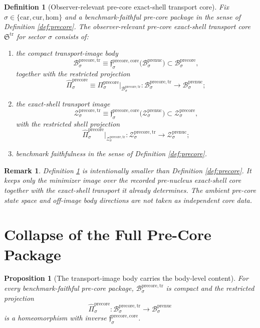 \documentclass[11pt]{article}
\newcommand{\Car}{\mathrm{car}}
\newcommand{\Cur}{\mathrm{cur}}
\newcommand{\Hom}{\mathrm{hom}}
\newcommand{\PreNucBody}[1]{\mathcal B_{#1}^{\mathrm{prenuc}}}
\newcommand{\PreNucShellSet}[1]{\mathcal Z_{#1}^{\mathrm{prenuc}}}
\newcommand{\PreCoreTransportCore}{\mathfrak S^{\mathrm{tr}}}
\newcommand{\PreCoreBody}[1]{\mathcal B_{#1}^{\mathrm{precore}}}
\newcommand{\PreCoreProj}[1]{\Pi_{#1}^{\mathrm{precore}}}
\newcommand{\PreCoreCoreMin}[1]{\mathfrak f_{#1}^{\mathrm{precore,core}}}
\newcommand{\PreCoreShellSet}[1]{\mathcal Z_{#1}^{\mathrm{precore}}}
\newcommand{\PreCoreTrBody}[1]{\mathcal B_{#1}^{\mathrm{precore,tr}}}
\newcommand{\PreCoreTrProj}[1]{\widehat{\Pi}_{#1}^{\mathrm{precore}}}
\newcommand{\PreCoreTrShell}[1]{\mathcal Z_{#1}^{\mathrm{precore,tr}}}
\newtheorem{definition}{Definition}
\newtheorem{proposition}{Proposition}
\newtheorem{remark}{Remark}
\begin{document}
\begin{definition}[Observer-relevant pre-core exact-shell transport core]
\label{def:transportcore}
Fix \(\sigma\in\{\Car,\Cur,\Hom\}\) and a benchmark-faithful pre-core package in the sense of Definition \ref{def:precore}. The \emph{observer-relevant pre-core exact-shell transport core} \(\PreCoreTransportCore\) for sector \(\sigma\) consists of:
\begin{enumerate}
    \item the compact transport-image body
    \[
    \PreCoreTrBody{\sigma}
    \equiv
    \PreCoreCoreMin{\sigma}\bigl(\PreNucBody{\sigma}\bigr)
    \subset
    \PreCoreBody{\sigma},
    \]
    together with the restricted projection
    \[
    \PreCoreTrProj{\sigma}
    \equiv
    \PreCoreProj{\sigma}\big|_{\PreCoreTrBody{\sigma}}
    :
    \PreCoreTrBody{\sigma}\to\PreNucBody{\sigma};
    \]
    \item the exact-shell transport image
    \[
    \PreCoreTrShell{\sigma}
    \equiv
    \PreCoreCoreMin{\sigma}\bigl(\PreNucShellSet{\sigma}\bigr)
    \subset
    \PreCoreShellSet{\sigma},
    \]
    with the restricted shell projection
    \[
    \PreCoreTrProj{\sigma}\big|_{\PreCoreTrShell{\sigma}}
    :
    \PreCoreTrShell{\sigma}\to\PreNucShellSet{\sigma};
    \]
    \item benchmark faithfulness in the sense of Definition \ref{def:precore}.
\end{enumerate}
\end{definition}

\begin{remark}
Definition \ref{def:transportcore} is intentionally smaller than Definition \ref{def:precore}. It keeps only the minimizer image over the recorded pre-nucleus exact-shell core together with the exact-shell transport it already determines. The ambient pre-core state space and off-image body directions are not taken as independent core data.
\end{remark}

\section{Collapse of the Full Pre-Core Package}

\begin{proposition}[The transport-image body carries the body-level content]
\label{prop:body}
For every benchmark-faithful pre-core package, \(\PreCoreTrBody{\sigma}\) is compact and the restricted projection
\[
\PreCoreTrProj{\sigma}:\PreCoreTrBody{\sigma}\to\PreNucBody{\sigma}
\]
is a homeomorphism with inverse \(\PreCoreCoreMin{\sigma}\).
\end{proposition}
\end{document}
